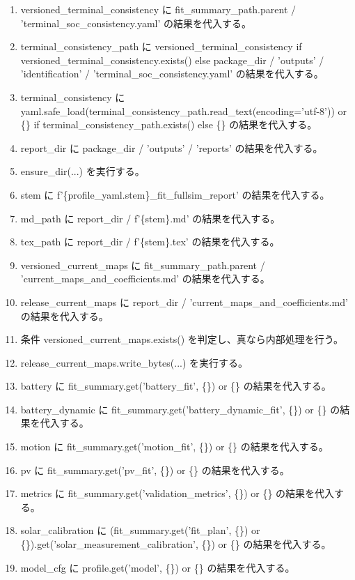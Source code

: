 \documentclass[a4paper,11pt]{article}
\begin{document}
\begin{enumerate}[leftmargin=1.8em]
\item versioned\_terminal\_consistency に fit\_summary\_path.parent / 'terminal\_soc\_consistency.yaml' の結果を代入する。
\item terminal\_consistency\_path に versioned\_terminal\_consistency if versioned\_terminal\_consistency.exists() else package\_dir / 'outputs' / 'identification' / 'terminal\_soc\_consistency.yaml' の結果を代入する。
\item terminal\_consistency に yaml.safe\_load(terminal\_consistency\_path.read\_text(encoding='utf-8')) or \{\} if terminal\_consistency\_path.exists() else \{\} の結果を代入する。
\item report\_dir に package\_dir / 'outputs' / 'reports' の結果を代入する。
\item ensure\_dir(...) を実行する。
\item stem に f'\{profile\_yaml.stem\}\_fit\_fullsim\_report' の結果を代入する。
\item md\_path に report\_dir / f'\{stem\}.md' の結果を代入する。
\item tex\_path に report\_dir / f'\{stem\}.tex' の結果を代入する。
\item versioned\_current\_maps に fit\_summary\_path.parent / 'current\_maps\_and\_coefficients.md' の結果を代入する。
\item release\_current\_maps に report\_dir / 'current\_maps\_and\_coefficients.md' の結果を代入する。
\item 条件 versioned\_current\_maps.exists() を判定し、真なら内部処理を行う。
\item   release\_current\_maps.write\_bytes(...) を実行する。
\item battery に fit\_summary.get('battery\_fit', \{\}) or \{\} の結果を代入する。
\item battery\_dynamic に fit\_summary.get('battery\_dynamic\_fit', \{\}) or \{\} の結果を代入する。
\item motion に fit\_summary.get('motion\_fit', \{\}) or \{\} の結果を代入する。
\item pv に fit\_summary.get('pv\_fit', \{\}) or \{\} の結果を代入する。
\item metrics に fit\_summary.get('validation\_metrics', \{\}) or \{\} の結果を代入する。
\item solar\_calibration に (fit\_summary.get('fit\_plan', \{\}) or \{\}).get('solar\_measurement\_calibration', \{\}) or \{\} の結果を代入する。
\item model\_cfg に profile.get('model', \{\}) or \{\} の結果を代入する。

\end{enumerate}
\end{document}
